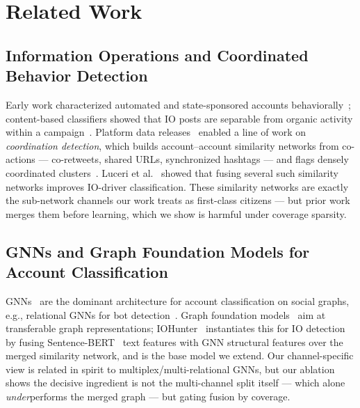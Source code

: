 \documentclass[conference]{IEEEtran}
\begin{document}
\section{Related Work}

\subsection{Information Operations and Coordinated Behavior Detection}
Early work characterized automated and state-sponsored accounts
behaviorally~\cite{ferrara2016rise, cresci2020decade,
zannettou2019disinformation}; content-based classifiers showed that IO posts
are separable from organic activity within a campaign~\cite{alizadeh2020content}.
Platform data releases~\cite{twitter2018enabling} enabled a line of work on
\emph{coordination detection}, which builds account--account similarity
networks from co-actions --- co-retweets, shared URLs, synchronized hashtags
--- and flags densely coordinated clusters~\cite{pacheco2021uncovering,
nizzoli2021coordinated, sharma2021identifying}. Luceri et
al.~\cite{luceri2024unmasking} showed that fusing several such similarity
networks improves IO-driver classification. These similarity networks are
exactly the sub-network channels our work treats as first-class citizens ---
but prior work merges them before learning, which we show is harmful under
coverage sparsity.

\subsection{GNNs and Graph Foundation Models for Account Classification}
GNNs~\cite{kipf2017gcn, velickovic2018gat, hamilton2017graphsage} are the
dominant architecture for account classification on social graphs, e.g.,
relational GNNs for bot detection~\cite{feng2021botrgcn}. Graph foundation
models~\cite{liu2023towards} aim at transferable graph representations;
IOHunter~\cite{minici2025iohunter} instantiates this for IO detection by
fusing Sentence-BERT~\cite{reimers2019sbert} text features with GNN
structural features over the merged similarity network, and is the base
model we extend. Our channel-specific view is related in spirit to
multiplex/multi-relational GNNs, but our ablation shows the decisive
ingredient is not the multi-channel split itself --- which alone
\emph{under}performs the merged graph --- but gating fusion by coverage.
\end{document}
